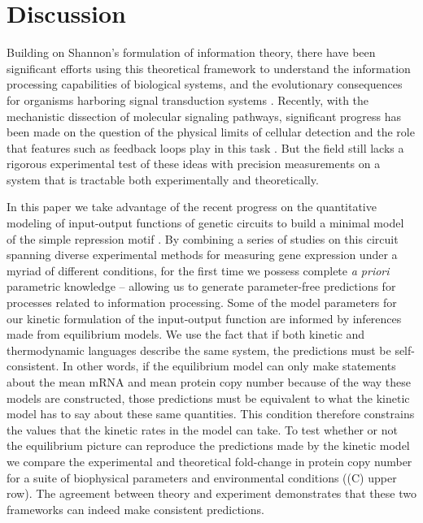 \section*{Discussion}

Building on Shannon's formulation of information theory, there have been
significant efforts using this theoretical framework to understand the
information processing capabilities of biological systems, and the evolutionary
consequences for organisms harboring signal transduction systems
\cite{Bergstrom2004, Taylor2007, Tkacik2008, Polani2009, Nemenman2010,
Rivoire2011}. Recently, with the mechanistic dissection of molecular signaling
pathways, significant progress has been made on the question of the physical
limits of cellular detection and the role that features such as feedback loops
play in this task \cite{Bialek2005, Libby2007, Tkacik2011, Rhee2012a,
Voliotis2014a}. But the field still lacks a rigorous experimental test of these
ideas with precision measurements on a system that is tractable both
experimentally and theoretically.

In this paper we take advantage of the recent progress on the quantitative
modeling of input-output functions of genetic circuits to build a minimal model
of the simple repression motif \cite{Phillips2019}. By combining a series of
studies on this circuit spanning diverse experimental methods for measuring gene
expression under a myriad of different conditions, for the first time we possess
complete \textit{a priori} parametric knowledge -- allowing us to generate
parameter-free predictions for processes related to information processing. Some
of the model parameters for our kinetic formulation of the input-output function
are informed by inferences made from equilibrium models. We use the fact that if
both kinetic and thermodynamic languages describe the same system, the
predictions must be self-consistent. In other words, if the equilibrium model
can only make statements about the mean mRNA and mean protein copy number
because of the way these models are constructed, those predictions must be
equivalent to what the kinetic model has to say about these same quantities.
This condition therefore constrains the values that the kinetic rates in the
model can take. To test whether or not the equilibrium picture can reproduce the
predictions made by the kinetic model we compare the experimental and
theoretical fold-change in protein copy number for a suite of biophysical
parameters and environmental conditions ((C) upper row).
The agreement between theory and experiment demonstrates that these two
frameworks can indeed make consistent predictions.

